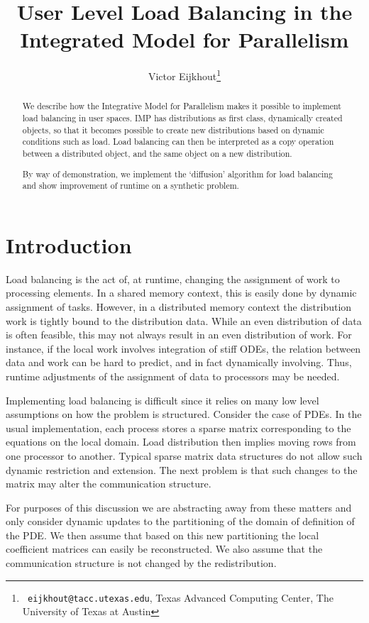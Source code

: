 \documentclass[11pt,fleqn]{article}
\title{User Level Load Balancing in the Integrated Model for Parallelism}
\author{Victor Eijkhout\thanks{{\tt
      eijkhout@tacc.utexas.edu}, Texas Advanced Computing
    Center, The University of Texas at Austin}}
\begin{document}
\maketitle

\begin{abstract}
  We describe how the Integrative Model for Parallelism makes it
  possible to implement load balancing in user spaces. IMP has
  distributions as first class, dynamically created objects, so that
  it becomes possible to create new distributions based on dynamic
  conditions such as load. Load balancing can then be interpreted as a
  copy operation between a distributed object, and the same object on
  a new distribution.

  By way of demonstration, we implement the `diffusion' algorithm for
  load balancing and show improvement of runtime on a synthetic problem.
\end{abstract}

\acresetall

\section{Introduction}

Load balancing is the act of, at runtime, changing the assignment of
work to processing elements. In a shared memory context, this is
easily done by dynamic assignment of tasks. However, 
in a distributed memory context the distribution work is tightly bound
to the distribution data. While an even distribution of data is often
feasible, this may not always result in an even distribution of
work. For instance, if the local work involves integration of stiff
\acp{ODE}, the relation between data and work can be hard to predict, and
in fact dynamically involving. Thus, runtime adjustments of the
assignment of data to processors may be needed.

Implementing load balancing is difficult since it relies on many low
level assumptions on how the problem is structured. Consider the case
of \acp{PDE}. In the usual implementation, each process stores a
sparse matrix corresponding to the equations on the local domain. Load
distribution then implies moving rows from one processor to
another. Typical sparse matrix data structures do not allow such
dynamic restriction and extension. The next problem is that such
changes to the matrix may alter the communication structure.

For purposes of this discussion we are abstracting away from these
matters and only consider dynamic updates to the partitioning of the
domain of definition of the \ac{PDE}. We then assume that based on
this new partitioning the local coefficient matrices can easily be
reconstructed. We also assume that the communication structure is not
changed by the redistribution.
\end{document}
